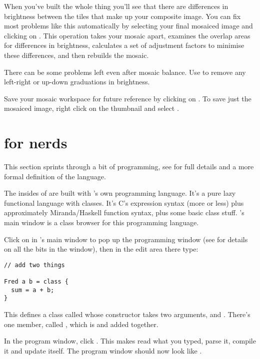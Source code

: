 When you've built the whole thing you'll see that there are differences
in brightness between the tiles that make up your composite image. You can
fix most problems like this automatically by selecting your final mosaiced
image and clicking on . This operation takes your
mosaic apart, examines the overlap areas for differences in brightness,
calculates a set of adjustment factors to minimise these differences,
and then rebuilds the mosaic.

There can be some problems left even after mosaic balance. Use
 to remove any left-right or up-down
graduations in brightness. 

Save your mosaic workspace for future reference by clicking on
. To save just the mosaiced image, right click
on the thumbnail and select .

\section{\nip{} for nerds}

This section sprints through a bit of \nip{} programming, see
 for full details and a more formal definition of the
language.

The insides of \nip{} are built with \nip{}'s own programming language. It's a
pure lazy functional language with classes. It's C's expression syntax
(more or less) plus approximately Miranda/Haskell function syntax,
plus some basic class stuff. \nip{}'s main window is a class browser for this
programming language.

Click on  in \nip{}'s main window to pop up the
programming window (see  for details on all the bits in the
window), then in the edit area there type:

\begin{verbatim}
// add two things
 
Fred a b = class {
  sum = a + b;
}
\end{verbatim}

This defines a class called  whose constructor takes two arguments,
 and . There's one member, called , which is 
and  added together.

In the program window, click . This makes \nip{}
read what you typed, parse it, compile it and update itself. The program
window should now look like .

